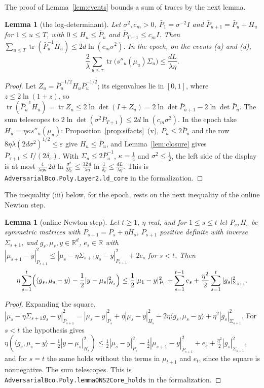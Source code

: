\documentclass[11pt]{amsart}
\newtheorem{lemma}[theorem]{Lemma}
\theoremstyle{definition}
\numberwithin{equation}{section}
\newcommand{\R}{\mathbb{R}}
\newcommand{\tr}{\operatorname{tr}}
\newcommand{\ip}[1]{\langle #1\rangle}
\begin{document}
The proof of Lemma~\ref{lem:events} bounds a sum of traces by the next lemma.

\begin{lemma}[the log-determinant]\label{lem:ld}
Let $\sigma^2,c_m>0$, $\bar P_1=\sigma^{-2}I$ and $\bar P_{u+1}=\bar P_u+H_u$ for $1\le u\le T$, with $0\le H_u\le\bar P_u$ and $\bar P_{T+1}\le c_mI$. Then $\sum_{u\le T}\tr(\bar P_u^{-1}H_u)\le2d\ln(c_m\sigma^2)$. In the epoch, on the events (a) and (d),
\[
\frac2\lambda\sum_{u\le\tau}\tr\bigl(s''_u(\mu_u)\Sigma_u\bigr)\le\frac{dL}{\lambda\eta}.
\]
\end{lemma}

\begin{proof}
Let $Z_u=\bar P_u^{-1/2}H_u\bar P_u^{-1/2}$; its eigenvalues lie in $[0,1]$, where $z\le2\ln(1+z)$, so $\tr(\bar P_u^{-1}H_u)=\tr Z_u\le2\ln\det(I+Z_u)=2\ln\det\bar P_{u+1}-2\ln\det\bar P_u$. The sum telescopes to $2\ln\det(\sigma^2\bar P_{T+1})\le2d\ln(c_m\sigma^2)$. In the epoch take $H_u=\eta\kappa s''_u(\mu_u)$: Proposition~\ref{prop:sifacts}~(v), $P_u\le2\bar P_u$ and the row $8\eta\lambda(2d\sigma^2)^{1/2}\le\varepsilon$ give $H_u\le\bar P_u$, and Lemma~\ref{lem:closure} gives $\bar P_{\tau+1}\le I/(2\delta_e)$. With $\Sigma_u\le2\bar P_u^{-1}$, $\kappa=\frac14$ and $\sigma^2\le\frac12$, the left side of the display is at most $\frac4{\lambda\eta\kappa}\,2d\ln\frac{\sigma^2}{2\delta_e}\le\frac{32\,d}{\lambda\eta}\ln\frac1{\delta_e}\le\frac{dL}{\lambda\eta}$.
This is \texttt{AdversarialBco.Poly.Layer2.ld\_core} in the formalization.
\end{proof}

The inequality (iii) below, for the epoch, rests on the next inequality of the online Newton step.

\begin{lemma}[online Newton step]\label{lem:ons2}
Let $t\ge1$, $\eta$ real, and for $1\le s\le t$ let $P_s,H_s$ be symmetric matrices with $P_{s+1}=P_s+\eta H_s$, $P_{s+1}$ positive definite with inverse $\Sigma_{s+1}$, and $g_s,\mu_s,y\in\R^d$, $e_s\in\R$ with $|\mu_{s+1}-y|^2_{P_{s+1}}\le|\mu_s-\eta\Sigma_{s+1}g_s-y|^2_{P_{s+1}}+2e_s$ for $s<t$. Then
\[
\eta\sum_{s=1}^t\Bigl(\ip{g_s,\mu_s-y}-\frac12|y-\mu_s|^2_{H_s}\Bigr)\le\frac12|\mu_1-y|^2_{P_1}+\sum_{s=1}^{t-1}e_s+\frac{\eta^2}2\sum_{s=1}^t|g_s|^2_{\Sigma_{s+1}} .
\]
\end{lemma}

\begin{proof}
Expanding the square, $|\mu_s-\eta\Sigma_{s+1}g_s-y|^2_{P_{s+1}}=|\mu_s-y|^2_{P_s}+\eta|\mu_s-y|^2_{H_s}-2\eta\ip{g_s,\mu_s-y}+\eta^2|g_s|^2_{\Sigma_{s+1}}$. For $s<t$ the hypothesis gives
$\eta(\ip{g_s,\mu_s-y}-\frac12|y-\mu_s|^2_{H_s})\le\frac12|\mu_s-y|^2_{P_s}-\frac12|\mu_{s+1}-y|^2_{P_{s+1}}+e_s+\frac{\eta^2}2|g_s|^2_{\Sigma_{s+1}}$, and for $s=t$ the same holds without the terms in $\mu_{t+1}$ and $e_t$, since the square is nonnegative. The sum telescopes.
This is \texttt{AdversarialBco.Poly.lemmaONS2Core\_holds} in the formalization.
\end{proof}
\end{document}
